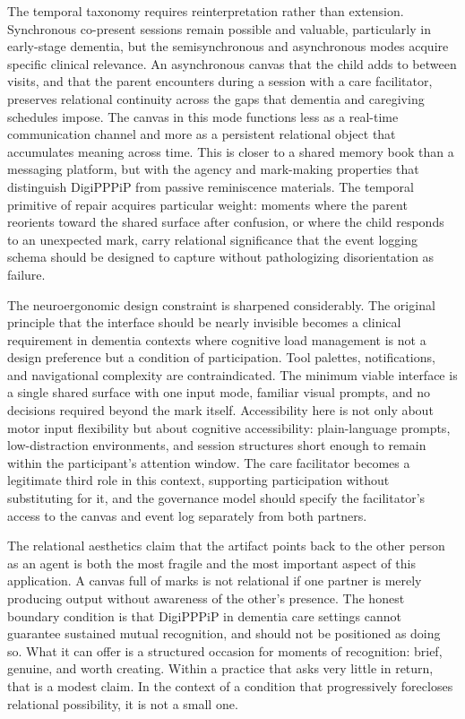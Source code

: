 \documentclass[
  english,
]{article}
\begin{document}
The temporal taxonomy requires reinterpretation rather than extension.
Synchronous co-present sessions remain possible and valuable,
particularly in early-stage dementia, but the semisynchronous and
asynchronous modes acquire specific clinical relevance. An asynchronous
canvas that the child adds to between visits, and that the parent
encounters during a session with a care facilitator, preserves
relational continuity across the gaps that dementia and caregiving
schedules impose. The canvas in this mode functions less as a real-time
communication channel and more as a persistent relational object that
accumulates meaning across time. This is closer to a shared memory book
than a messaging platform, but with the agency and mark-making
properties that distinguish DigiPPPiP from passive reminiscence
materials. The temporal primitive of repair acquires particular weight:
moments where the parent reorients toward the shared surface after
confusion, or where the child responds to an unexpected mark, carry
relational significance that the event logging schema should be designed
to capture without pathologizing disorientation as failure.

The neuroergonomic design constraint is sharpened considerably. The
original principle that the interface should be nearly invisible becomes
a clinical requirement in dementia contexts where cognitive load
management is not a design preference but a condition of participation.
Tool palettes, notifications, and navigational complexity are
contraindicated. The minimum viable interface is a single shared surface
with one input mode, familiar visual prompts, and no decisions required
beyond the mark itself. Accessibility here is not only about motor input
flexibility but about cognitive accessibility: plain-language prompts,
low-distraction environments, and session structures short enough to
remain within the participant's attention window. The care facilitator
becomes a legitimate third role in this context, supporting
participation without substituting for it, and the governance model
should specify the facilitator's access to the canvas and event log
separately from both partners.

The relational aesthetics claim that the artifact points back to the
other person as an agent is both the most fragile and the most important
aspect of this application. A canvas full of marks is not relational if
one partner is merely producing output without awareness of the other's
presence. The honest boundary condition is that DigiPPPiP in dementia
care settings cannot guarantee sustained mutual recognition, and should
not be positioned as doing so. What it can offer is a structured
occasion for moments of recognition: brief, genuine, and worth creating.
Within a practice that asks very little in return, that is a modest
claim. In the context of a condition that progressively forecloses
relational possibility, it is not a small one.
\end{document}
